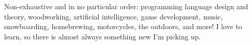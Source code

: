 \documentclass[10pt,a4paper]{article}
\begin{document}

\inlineheadsection
  {Non-exhaustive and in no particular order:}
  {programming language design and theory, woodworking, artificial intelligence, game development, music, snowboarding, homebrewing, motorcycles, the outdoors, and more! I love to learn, so there is almost always something new I'm picking up.}
\end{document}
